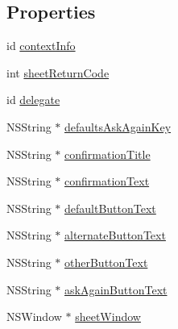 \subsection*{Properties}
\begin{DoxyCompactItemize}
\item 
id \hyperlink{interface_confirmation_sheet_controller_a1dc27473f45c0381d0db971e87498ecf}{context\-Info}
\item 
int \hyperlink{interface_confirmation_sheet_controller_acc507979f5b4a4d2b23f6d1a7d6c3fb1}{sheet\-Return\-Code}
\item 
id \hyperlink{interface_confirmation_sheet_controller_a8d9332fcd23523b1e2520b8765577423}{delegate}
\item 
N\-S\-String $\ast$ \hyperlink{interface_confirmation_sheet_controller_a1a21057b4b9576370d426feffd44d65a}{defaults\-Ask\-Again\-Key}
\item 
N\-S\-String $\ast$ \hyperlink{interface_confirmation_sheet_controller_ae1e92fa581da0eee62954e9e8d2a31d8}{confirmation\-Title}
\item 
N\-S\-String $\ast$ \hyperlink{interface_confirmation_sheet_controller_a058fe1286ed9e8b1166bc5e2719ecc5a}{confirmation\-Text}
\item 
N\-S\-String $\ast$ \hyperlink{interface_confirmation_sheet_controller_aa5eda274d0f7593581a5963f28cb7efa}{default\-Button\-Text}
\item 
N\-S\-String $\ast$ \hyperlink{interface_confirmation_sheet_controller_a007c6d38dc8a9ae9065e73bdbea52d3f}{alternate\-Button\-Text}
\item 
N\-S\-String $\ast$ \hyperlink{interface_confirmation_sheet_controller_af037696a8b4cd94f65fbdb8a1104499d}{other\-Button\-Text}
\item 
N\-S\-String $\ast$ \hyperlink{interface_confirmation_sheet_controller_a7febe5e5d594cfc8116521126dfe164a}{ask\-Again\-Button\-Text}
\item 
N\-S\-Window $\ast$ \hyperlink{interface_confirmation_sheet_controller_a6cc8fe2aebbd3a3092a3efa1a01cacb0}{sheet\-Window}
\end{DoxyCompactItemize}


